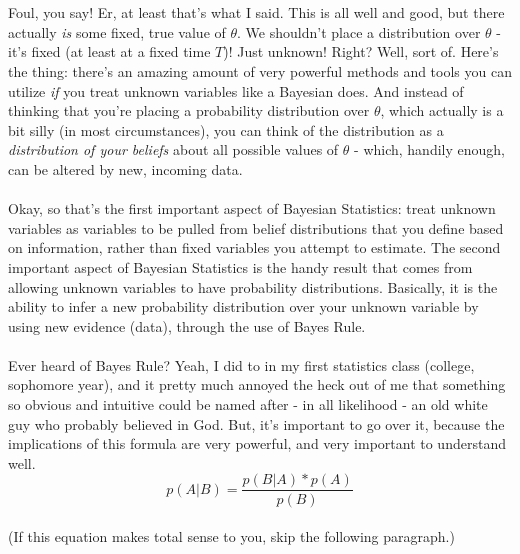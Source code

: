 \documentclass[12pt]{book}
\begin{document}
\\\\
Foul, you say! Er, at least that's what I said. This is all well and good, but there actually \textit{is}  some fixed, true value of $\theta$. We shouldn't place a distribution over $\theta$ - it's fixed (at least at a fixed time $T$)! Just unknown! Right? Well, sort of. Here's the thing: there's an amazing amount of very powerful methods and tools you can utilize \textit{if} you treat unknown variables like a Bayesian does. And instead of thinking that you're placing a probability distribution over $\theta$, which actually is a bit silly (in most circumstances), you can think of the distribution as a  \textit{distribution of your beliefs} about all possible values of $\theta$ - which, handily enough, can be altered by new, incoming data. 
\\\\
Okay, so that's the first important aspect of Bayesian Statistics: treat unknown variables as variables to be pulled from belief distributions that you define based on information, rather than fixed variables you attempt to estimate. The second important aspect of Bayesian Statistics is the handy result that comes from allowing unknown variables to have probability distributions. Basically, it is the ability to infer a new probability distribution over your unknown variable by using new evidence (data), through the use of Bayes Rule.
\\\\
Ever heard of Bayes Rule? Yeah, I did to in my first statistics class (college, sophomore year), and it pretty much annoyed the heck out of me that something so obvious and intuitive could be named after - in all likelihood - an old white guy who probably believed in God. But, it's important to go over it, because the implications of this formula are very powerful, and very important to understand well.
\\
\begin{equation}
p(A|B) = \frac{p(B|A)*p(A)}{p(B)}
\end{equation}
\\
(If this equation makes total sense to you, skip the following paragraph.)
\\\\
  \def\secondcircle{(210:1.25cm) circle (1.75cm)}
  \def\thirdcircle{(330:.75cm) circle (2.5cm)}
  
\end{document}
